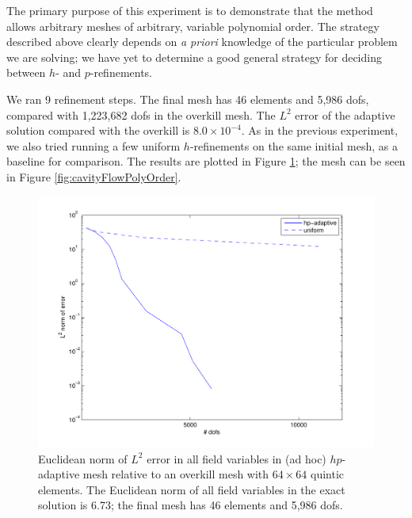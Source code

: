 The primary purpose of this experiment is to demonstrate that the method allows arbitrary meshes of arbitrary, variable polynomial order.  The strategy described above clearly depends on \emph{a priori} knowledge of the particular problem we are solving; we have yet to determine a good general strategy for deciding between $h$- and $p$-refinements.

We ran 9 refinement steps.  The final mesh has 46 elements and 5,986 dofs, compared with 1,223,682 dofs in the overkill mesh.  The $L^{2}$ error of the adaptive solution compared with the overkill is $8.0 \times 10^{-4}$.  As in the previous experiment, we also tried running a few uniform $h$-refinements on the same initial mesh, as a baseline for comparison.  The results are plotted in Figure \ref{fig:hp_adaptive_cavity_flow_vs_overkill}; the mesh can be seen in Figure \ref{fig:cavityFlowPolyOrder}.

\begin{figure}[h!b!p!]
\centering
\includegraphics[scale=0.60]{./figures/hp_adaptive_cavity_flow_vs_overkill.pdf}
\caption{Euclidean norm of $L^{2}$ error in all field variables in (ad hoc) $hp$-adaptive mesh relative to an overkill mesh with $64 \times 64$ quintic elements.  The Euclidean norm of all field variables in the exact solution is 6.73; the final mesh has 46 elements and 5,986 dofs.
}
\label{fig:hp_adaptive_cavity_flow_vs_overkill}
\end{figure}

